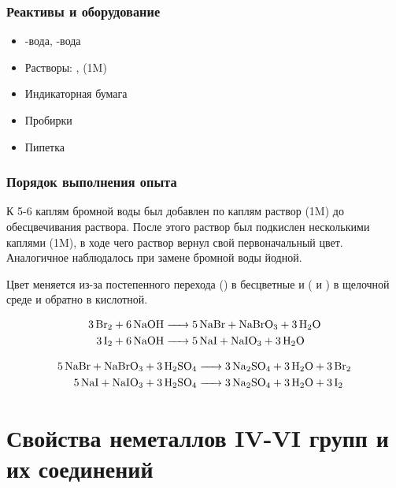\documentclass[a4paper, 12pt]{article}
\begin{document}
\subsubsection{Реактивы и оборудование}

\begin{itemize}
	\item {}-вода, -вода
	
	\item Растворы: ,  (1M)
	
	\item Индикаторная бумага
	
	\item Пробирки
	
	\item Пипетка
\end{itemize}

\subsubsection{Порядок выполнения опыта}

К 5-6 каплям бромной воды был добавлен по каплям раствор  (1M) до обесцвечивания раствора. После этого раствор был подкислен несколькими каплями  (1M), в ходе чего раствор вернул свой первоначальный цвет. Аналогичное наблюдалось при замене бромной воды йодной.

Цвет меняется из-за постепенного перехода  () в бесцветные  и  ( и ) в щелочной среде и обратно в кислотной.

\begin{align}
	\ce{3Br2 + 6NaOH &-> 5NaBr + NaBrO3 + 3H2O}\\
	\ce{3I2 + 6NaOH &-> 5NaI + NaIO3 + 3H2O}
\end{align}

\begin{align}
	\ce{5NaBr + NaBrO3 + 3H2SO4 &-> 3Na2SO4 + 3H2O + 3Br2}\\
	\ce{5NaI + NaIO3 + 3H2SO4 &-> 3Na2SO4 + 3H2O + 3I2}
\end{align}

\newpage


\section{Свойства неметаллов IV-VI групп и их соединений}
\end{document}
